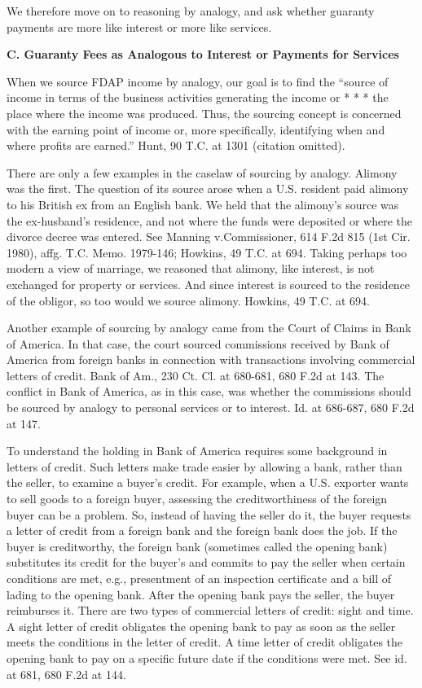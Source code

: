 \begin{select}
We therefore move on to reasoning by analogy, and ask whether guaranty payments are more like interest or more like services.

\begin{center}
	\textbf{C. Guaranty Fees as Analogous to Interest or Payments for Services}
		\end{center}

When we source FDAP income by analogy, our goal is to find the ``source of income in terms of the business activities generating the income or * * * the place where the income was produced. Thus, the sourcing concept is concerned with the earning point of income or, more specifically, identifying when and where profits are earned.'' Hunt, 90 T.C. at 1301 (citation omitted).

There are only a few examples in the caselaw of sourcing by analogy. Alimony was the first. The question of its source arose when a U.S. resident paid alimony to his British ex from an English bank. We held that the alimony's source was the ex-husband's residence, and not where the funds were deposited or where the divorce decree was entered. See Manning v.\@ Commissioner, 614 F.2d 815 (1st Cir. 1980), affg. T.C. Memo. 1979-146; Howkins, 49 T.C. at 694. Taking perhaps too modern a view of marriage, we reasoned that alimony, like interest, is not exchanged for property or services. And since interest is sourced to the residence of the obligor, so too would we source alimony. Howkins, 49 T.C. at 694.

Another example of sourcing by analogy came from the Court of Claims in Bank of America. In that case, the court sourced commissions received by Bank of America from foreign banks in connection with transactions involving commercial letters of credit. Bank of Am., 230 Ct. Cl. at 680-681, 680 F.2d at 143. The conflict in Bank of America, as in this case, was whether the commissions should be sourced by analogy to personal services or to interest. Id. at 686-687, 680 F.2d at 147.

To understand the holding in Bank of America requires some background in letters of credit. Such letters make trade easier by allowing a bank, rather than the seller, to examine a buyer's credit.   For example, when a U.S. exporter wants to sell goods to a foreign buyer, assessing the creditworthiness of the foreign buyer can be a problem. So, instead of having the seller do it, the buyer requests a letter of credit from a foreign bank and the foreign bank does the job. If the buyer is creditworthy, the foreign bank (sometimes called the opening bank) substitutes its credit for the buyer's and commits to pay the seller when certain conditions are met, e.g., presentment of an inspection certificate and a bill of lading to the opening bank. After the opening bank pays the seller, the buyer reimburses it. There are two types of commercial letters of credit: sight and time. A sight letter of credit obligates the opening bank to pay as soon as the seller meets the conditions in the letter of credit. A time letter of credit obligates the opening bank to pay on a specific future date if the conditions were met. See id. at 681, 680 F.2d at 144.


\end{select}
